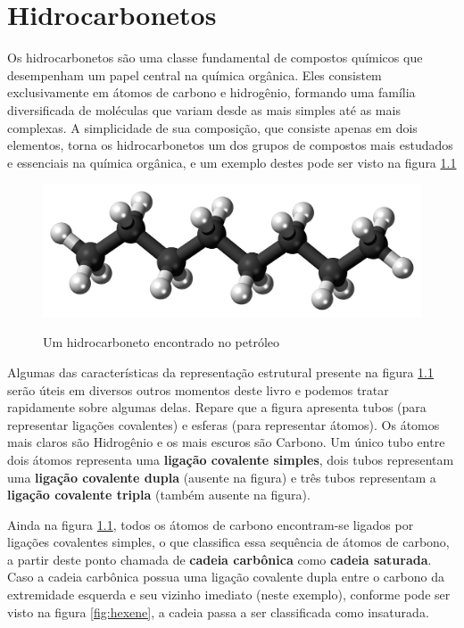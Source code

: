 \chapter{Hidrocarbonetos}
Os hidrocarbonetos são uma classe fundamental de compostos químicos que desempenham um papel central na química orgânica. Eles consistem exclusivamente em átomos de carbono e hidrogênio, formando uma família diversificada de moléculas que variam desde as mais simples até as mais complexas. A simplicidade de sua composição, que consiste apenas em dois elementos, torna os hidrocarbonetos um dos grupos de compostos mais estudados e essenciais na química orgânica, e um exemplo destes pode ser visto na figura \ref{fig:ocatene}

\begin{figure}[h]\centering
\caption{Um hidrocarboneto encontrado no petróleo}
\includegraphics[scale=0.175]{imagens/Octane_3D_ball.png}
\label{fig:ocatene}\vspace{0.5cm}\end{figure}

Algumas das características da representação estrutural presente na figura \ref{fig:ocatene} serão úteis em diversos outros momentos deste livro e podemos tratar rapidamente sobre algumas delas. Repare que a figura apresenta tubos (para representar ligações covalentes) e esferas (para representar átomos). Os átomos mais claros são Hidrogênio e os mais escuros são Carbono. Um único tubo entre dois átomos representa uma \textbf{ligação covalente simples}, dois tubos representam uma \textbf{ligação covalente dupla} (ausente na figura) e três tubos representam a \textbf{ligação covalente tripla} (também ausente na figura).

Ainda na figura \ref{fig:ocatene}, todos os átomos de carbono encontram-se ligados por ligações covalentes simples, o que classifica essa sequência de átomos de carbono, a partir deste ponto chamada de \textbf{cadeia carbônica} como \textbf{cadeia saturada}. Caso a cadeia carbônica possua uma ligação covalente dupla entre o carbono da extremidade esquerda e seu vizinho imediato (neste exemplo), conforme pode ser visto na figura \ref{fig:hexene}, a cadeia passa a ser classificada como insaturada.

